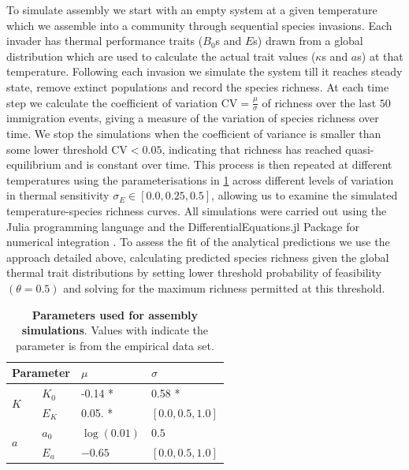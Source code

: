 \documentclass{article}
\begin{document}
To simulate assembly we start with an empty system at a given temperature which we assemble into a community through sequential species invasions. Each invader has thermal performance traits ($B_0$s and $E$s) drawn from a global distribution which are used to calculate the actual trait values ($\kappa$s and $a$s) at that temperature. Following each invasion we simulate the system till it reaches steady state, remove extinct populations and record the species richness. At each time step we calculate the coefficient of variation $\text{CV} = \frac{\mu}{\sigma}$ of richness over the last $50$ immigration events, giving a measure of the variation of species richness over time. We stop the simulations when the coefficient of variance is smaller than some lower threshold $\text{CV} < 0.05$, indicating that richness has reached quasi-equilibrium and is constant over time. This process is then repeated at different temperatures using the parameterisations in \cref{Tab:SimParams} across different levels of variation in thermal sensitivity $\sigma_E \in [0.0, 0.25, 0.5]$, allowing us to examine the simulated temperature-species richness curves. All simulations were carried out using the Julia programming language and the DifferentialEquations.jl Package for numerical integration \citep{Rackauckas2017}. To assess the fit of the analytical predictions we use the approach detailed above, calculating predicted species richness given the global thermal trait distributions by setting lower threshold probability of feasibility $(\theta = 0.5)$ and solving for the maximum richness permitted at this threshold.

\begin{table}[h]
    \centering
   \begin{tabular}{llll}
        \hline
        \multicolumn{2}{l}{Parameter} & $\mu$        & $\sigma$          \\ \hline
        \multirow{2}{*}{$K$}  & $K_0$ & -0.14 *      & 0.58 *            \\
                              & $E_K$ & 0.05. *      & $[0.0, 0.5, 1.0]$ \\
        \multirow{2}{*}{$a$}  & $a_0$ & $\log(0.01)$ & $0.5$             \\
                              & $E_a$ & $-0.65$      & $[0.0, 0.5, 1.0]$ \\
        \hline
\end{tabular}
    \caption{\textbf{Parameters used for assembly simulations}. Values with indicate the parameter is from the empirical data set.}
    \label{Tab:SimParams}
\end{table}
\end{document}
